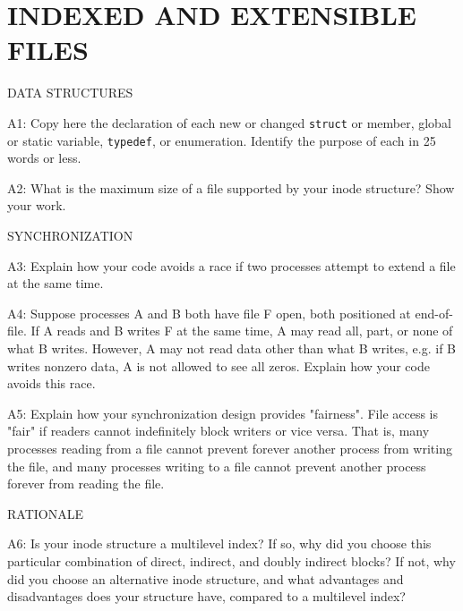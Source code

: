 \section*{INDEXED AND EXTENSIBLE FILES}

\begin{aspect}{DATA STRUCTURES}
  \begin{qc}
    A1: Copy here the declaration of each new or changed \lstinline{struct} or member,
    global or static variable, \lstinline{typedef}, or enumeration.
    Identify the purpose of each in 25 words or less.
  \end{qc}
  \begin{qc}
    A2: What is the maximum size of a file supported by your inode
    structure?  Show your work.
  \end{qc}
\end{aspect}

\begin{aspect}{SYNCHRONIZATION}
  \begin{qc}
    A3: Explain how your code avoids a race if two processes attempt to
    extend a file at the same time.
  \end{qc}
  \begin{qc}
    A4: Suppose processes A and B both have file F open, both
    positioned at end-of-file.  If A reads and B writes F at the same
    time, A may read all, part, or none of what B writes.  However, A
    may not read data other than what B writes, e.g. if B writes
    nonzero data, A is not allowed to see all zeros.  Explain how your
    code avoids this race.
  \end{qc}
  \begin{qc}
    A5: Explain how your synchronization design provides "fairness".
    File access is "fair" if readers cannot indefinitely block writers
    or vice versa.  That is, many processes reading from a file cannot
    prevent forever another process from writing the file, and many
    processes writing to a file cannot prevent another process forever
    from reading the file.
  \end{qc}
\end{aspect}

\begin{aspect}{RATIONALE}
  \begin{qc}
    A6: Is your inode structure a multilevel index?  If so, why did you
    choose this particular combination of direct, indirect, and doubly
    indirect blocks?  If not, why did you choose an alternative inode
    structure, and what advantages and disadvantages does your
    structure have, compared to a multilevel index?
  \end{qc}
\end{aspect}
